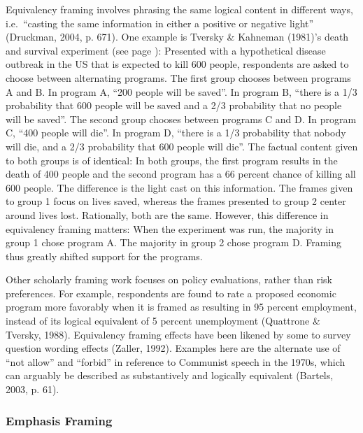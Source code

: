 \documentclass[12pt,econ]{sources/authesis}
\begin{document}
Equivalency framing involves phrasing the same logical content in different ways, i.e.~``casting the same information in either a positive or negative light'' (Druckman, 2004, p. 671). One example is Tversky \& Kahneman (1981)'s death and survival experiment (see page \pageref{death}): Presented with a hypothetical disease outbreak in the US that is expected to kill 600 people, respondents are asked to choose between alternating programs. The first group chooses between programs A and B. In program A, ``200 people will be saved''. In program B, ``there is a 1/3 probability that 600 people will be saved and a 2/3 probability that no people will be saved''. The second group chooses between programs C and D. In program C, ``400 people will die''. In program D, ``there is a 1/3 probability that nobody will die, and a 2/3 probability that 600 people will die''. The factual content given to both groups is of identical: In both groups, the first program results in the death of 400 people and the second program has a 66 percent chance of killing all 600 people. The difference is the light cast on this information. The frames given to group 1 focus on lives saved, whereas the frames presented to group 2 center around lives lost. Rationally, both are the same. However, this difference in equivalency framing matters: When the experiment was run, the majority in group 1 chose program A. The majority in group 2 chose program D. Framing thus greatly shifted support for the programs.

Other scholarly framing work focuses on policy evaluations, rather than risk preferences. For example, respondents are found to rate a proposed economic program more favorably when it is framed as resulting in 95 percent employment, instead of its logical equivalent of 5 percent unemployment (Quattrone \& Tversky, 1988). Equivalency framing effects have been likened by some to survey question wording effects (Zaller, 1992). Examples here are the alternate use of ``not allow'' and ``forbid'' in reference to Communist speech in the 1970s, which can arguably be described as substantively and logically equivalent (Bartels, 2003, p. 61).

\hypertarget{framing-theory-framing-emph}{%
\subsubsection{Emphasis Framing}\label{framing-theory-framing-emph}}
\end{document}
